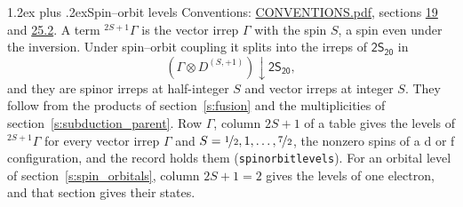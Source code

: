 \documentclass[10pt,a4paper]{article}
\makeatletter
\renewcommand\section{\@startsection{section}{1}{\z@}{-3ex plus -1ex minus -.2ex}%
  {1.2ex plus .2ex}{\normalfont\large\sffamily\bfseries\color{parttitle}}}
\numberwithin{equation}{section}
\newcommand{\grp}[1]{\mathsf{#1}}
\newcommand{\restr}[2]{#1\!\downarrow#2}
\newcommand{\irrJp}[2]{D^{(#1,#2)}}
\newcommand{\irrprod}{\otimes}
\newcommand{\term}[2]{{}^{#1}#2}
\makeatother
\begin{document}
\section{Spin--orbit levels}\label{s:spin_orbit}
Conventions: \href{../../CONVENTIONS.pdf}{CONVENTIONS.pdf}, sections \href{../../../rotation/CONVENTIONS.pdf\#conv.19}{19} and \href{../../CONVENTIONS.pdf\#conv.25.2}{25.2}.
\leavevmode\label{n:local.spin}\label{n:symbol.term}A term $\term{2S+1}{\Gamma}$ is the vector irrep $\Gamma$ with the spin $S$, a spin even under the inversion. Under spin--orbit coupling it splits into the irreps of $\grp{2S_{20}}$ in
\begin{equation}\label{e:spinorbit}\restr{(\Gamma \irrprod \irrJp{S}{+1})}{\grp{2S_{20}}},\end{equation}
and they are spinor irreps at half-integer $S$ and vector irreps at integer $S$. They follow from the products of section~\ref{s:fusion} and the multiplicities of section~\ref{s:subduction_parent}. Row $\Gamma$, column $2S + 1$ of a table gives the levels of $\term{2S+1}{\Gamma}$ for every vector irrep $\Gamma$ and $S = \nicefrac{1}{2}, 1, \dots, \nicefrac{7}{2}$, the nonzero spins of a d or f configuration, and the record holds them (\texttt{spinorbitlevels}). For an orbital level of section~\ref{s:spin_orbitals}, column $2S + 1 = 2$ gives the levels of one electron, and that section gives their states.
\end{document}

